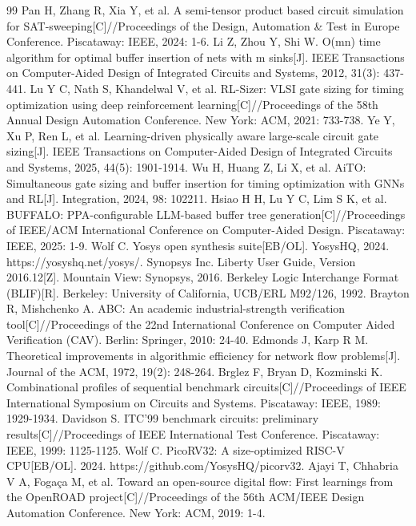 \documentclass[twocolumn,10pt,fontset=windows]{ctexart}
\begin{document}
\begin{thebibliography}{99}
 Pan H, Zhang R, Xia Y, et al. A semi-tensor product based circuit simulation for SAT-sweeping[C]//Proceedings of the Design, Automation \& Test in Europe Conference. Piscataway: IEEE, 2024: 1-6.
 Li Z, Zhou Y, Shi W. O(mn) time algorithm for optimal buffer insertion of nets with m sinks[J]. IEEE Transactions on Computer-Aided Design of Integrated Circuits and Systems, 2012, 31(3): 437-441.
 Lu Y C, Nath S, Khandelwal V, et al. RL-Sizer: VLSI gate sizing for timing optimization using deep reinforcement learning[C]//Proceedings of the 58th Annual Design Automation Conference. New York: ACM, 2021: 733-738.
 Ye Y, Xu P, Ren L, et al. Learning-driven physically aware large-scale circuit gate sizing[J]. IEEE Transactions on Computer-Aided Design of Integrated Circuits and Systems, 2025, 44(5): 1901-1914.
 Wu H, Huang Z, Li X, et al. AiTO: Simultaneous gate sizing and buffer insertion for timing optimization with GNNs and RL[J]. Integration, 2024, 98: 102211.
 Hsiao H H, Lu Y C, Lim S K, et al. BUFFALO: PPA-configurable LLM-based buffer tree generation[C]//Proceedings of IEEE/ACM International Conference on Computer-Aided Design. Piscataway: IEEE, 2025: 1-9.
 Wolf C. Yosys open synthesis suite[EB/OL]. YosysHQ, 2024. https://yosyshq.net/yosys/.
 Synopsys Inc. Liberty User Guide, Version 2016.12[Z]. Mountain View: Synopsys, 2016.
 Berkeley Logic Interchange Format (BLIF)[R]. Berkeley: University of California, UCB/ERL M92/126, 1992.
 Brayton R, Mishchenko A. ABC: An academic industrial-strength verification tool[C]//Proceedings of the 22nd International Conference on Computer Aided Verification (CAV). Berlin: Springer, 2010: 24-40.
 Edmonds J, Karp R M. Theoretical improvements in algorithmic efficiency for network flow problems[J]. Journal of the ACM, 1972, 19(2): 248-264.
 Brglez F, Bryan D, Kozminski K. Combinational profiles of sequential benchmark circuits[C]//Proceedings of IEEE International Symposium on Circuits and Systems. Piscataway: IEEE, 1989: 1929-1934.
 Davidson S. ITC'99 benchmark circuits: preliminary results[C]//Proceedings of IEEE International Test Conference. Piscataway: IEEE, 1999: 1125-1125.
 Wolf C. PicoRV32: A size-optimized RISC-V CPU[EB/OL]. 2024. https://github.com/YosysHQ/picorv32.
 Ajayi T, Chhabria V A, Fogaça M, et al. Toward an open-source digital flow: First learnings from the OpenROAD project[C]//Proceedings of the 56th ACM/IEEE Design Automation Conference. New York: ACM, 2019: 1-4.

\end{thebibliography}
\end{document}
